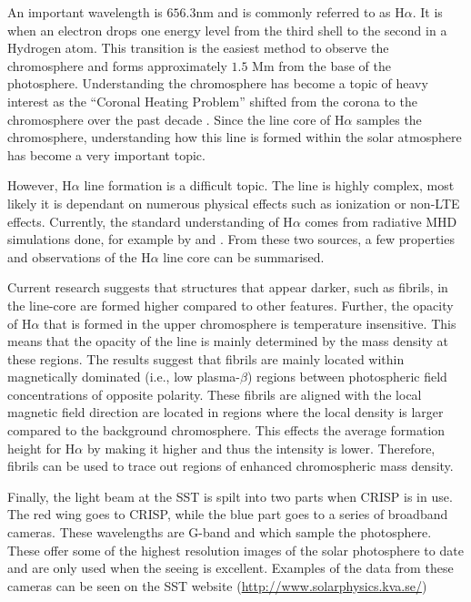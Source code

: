     An important wavelength is $656.3$nm and is commonly referred to as H$\alpha$.
    It is when an electron drops one energy level from the third shell to the second in a Hydrogen atom.
    This transition is the easiest method to observe the chromosphere and forms approximately $1.5$ Mm from the base of the photosphere.
    Understanding the chromosphere has become a topic of heavy interest as the ``Coronal Heating Problem'' shifted from the corona to the chromosphere over the past decade \citep{Aschwanden2007}. 
    Since the line core of H$\alpha$ samples the chromosphere, understanding how this line is formed within the solar atmosphere has become a very important topic. 
    
    However, H$\alpha$ line formation is a difficult topic.
    The line is highly complex, most likely it is dependant on numerous physical effects such as ionization or non-LTE effects. 
    Currently, the standard understanding of H$\alpha$ comes from radiative MHD simulations done, for example by \cite{Leenaarts2007} and \cite{Leenaarts2012}.
    From these two sources, a few properties and observations of the H$\alpha$ line core can be summarised.
    
    Current research suggests that structures that appear darker, such as fibrils, in the line-core are formed higher compared to other features.
    Further, the opacity of H$\alpha$ that is formed in the upper chromosphere is temperature insensitive.
    This means that the opacity of the line is mainly determined by the mass density at these regions.
    The results suggest that fibrils are mainly located within magnetically dominated (i.e., low plasma-$\beta$) regions between photospheric field concentrations of opposite polarity.
    These fibrils are aligned with the local magnetic field direction are located in regions where the local density is larger compared to the background chromosphere. 
    This effects the average formation height for H$\alpha$ by making it higher and thus the intensity is lower.
    Therefore, fibrils can be used to trace out regions of enhanced chromospheric mass density. 
    
    Finally, the light beam at the SST is spilt into two parts when CRISP is in use.
    The red wing goes to CRISP, while the blue part goes to a series of broadband cameras.
    These wavelengths are G-band and  which sample the photosphere.
    These offer some of the highest resolution images of the solar photosphere to date and are only used when the seeing is excellent. 
    Examples of the data from these cameras can be seen on the SST website (\url{http://www.solarphysics.kva.se/})
    
